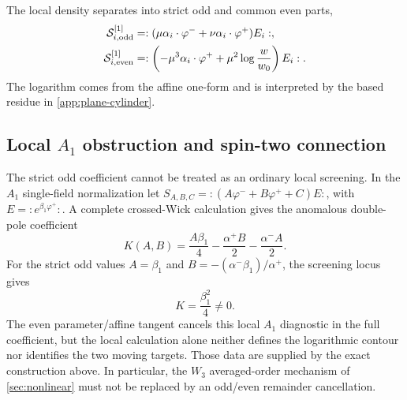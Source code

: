 \documentclass[11pt,a4paper]{article}
\numberwithin{equation}{section}
\theoremstyle{remark}
\newcommand{\cS}{\mathcal S}
\begin{document}
The local density separates into strict odd and common even parts,
\begin{align}
 \cS_{i,\rm odd}^{[1]}&=:
 (\mu\alpha_i\cdot\varphi^-+\nu\alpha_i\cdot\varphi^+)E_i:,
 \label{eq:odd-density}\\
 \cS_{i,\rm even}^{[1]}&=:
 \left(-\mu^3\alpha_i\cdot\varphi^+
 +\mu^2\log\frac{w}{w_0}\right)E_i:.
 \label{eq:even-density}
\end{align}
The logarithm comes from the affine one-form and is interpreted by the based residue in
\cref{app:plane-cylinder}.

\subsection{Local \texorpdfstring{$A_1$}{A1} obstruction and spin-two connection}

The strict odd coefficient cannot be treated as an ordinary local screening.  In the $A_1$
single-field normalization let
$S_{A,B,C}=:(A\varphi^-+B\varphi^++C)E:$, with
$E=:e^{\beta_1\varphi^+}:$.  A complete crossed-Wick calculation gives the anomalous
double-pole coefficient
\begin{equation}
 K(A,B)=\frac{A\beta_1}{4}-\frac{\alpha^+B}{2}-\frac{\alpha^-A}{2}.
 \label{eq:local-obstruction}
\end{equation}
For the strict odd values $A=\beta_1$ and
$B=-(\alpha^-\beta_1)/\alpha^+$, the screening locus gives
\begin{equation}
 K=\frac{\beta_1^2}{4}\ne0.
 \label{eq:strict-odd-obstruction}
\end{equation}
The even parameter/affine tangent cancels this local $A_1$ diagnostic in the full coefficient,
but the local calculation alone neither defines the logarithmic contour nor identifies the two
moving targets.  Those data are supplied by the exact construction above.  In particular, the
$W_3$ averaged-order mechanism of \cref{sec:nonlinear} must not be replaced by an odd/even
remainder cancellation.
\end{document}
